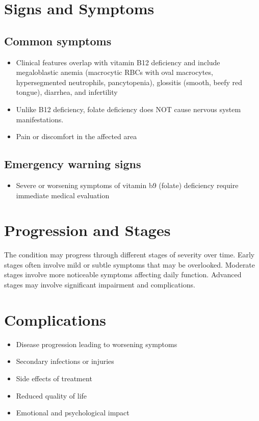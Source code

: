 \section{Signs and Symptoms}
\subsection{Common symptoms}
\begin{itemize}[noitemsep]
  \item Clinical features overlap with vitamin B12 deficiency and include megaloblastic anemia (macrocytic RBCs with oval macrocytes, hypersegmented neutrophils, pancytopenia), glossitis (smooth, beefy red tongue), diarrhea, and infertility
  \item Unlike B12 deficiency, folate deficiency does NOT cause nervous system manifestations.
  \item Pain or discomfort in the affected area
  \end{itemize}
\subsection{Emergency warning signs}
\begin{itemize}[noitemsep]
  \item Severe or worsening symptoms of vitamin b9 (folate) deficiency require immediate medical evaluation
\end{itemize}
\section{Progression and Stages}
The condition may progress through different stages of severity over time. Early stages often involve mild or subtle symptoms that may be overlooked. Moderate stages involve more noticeable symptoms affecting daily function. Advanced stages may involve significant impairment and complications.
\section{Complications}
\begin{itemize}[noitemsep]
  \item Disease progression leading to worsening symptoms
  \item Secondary infections or injuries
  \item Side effects of treatment
  \item Reduced quality of life
  \item Emotional and psychological impact
\end{itemize}
